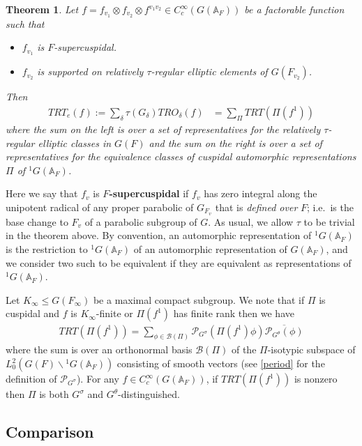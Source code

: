 \documentclass[12pt]{amsart}
\newtheorem{thm}{Theorem}[section]
\theoremstyle{remark}
\numberwithin{equation}{section}
\newcommand{\A}{\mathbb{A}}
\theoremstyle{definition}
\numberwithin{equation}{subsection}
\begin{document}
\begin{thm} \label{thm-rel-trace-formula} Let $f=f_{v_1} \otimes f_{v_2}\otimes f^{v_1v_2} \in C_c^{\infty}(G(\A_F))$ be a factorable function such that
\begin{itemize}
\item $f_{v_1}$ is $F$-supercuspidal.
\item $f_{v_2}$ is supported on relatively $\tau$-regular elliptic elements of $G(F_{v_2})$.
\end{itemize}
Then
\begin{align}\label{rtf}
TRT_e(f):=\sum_{\delta}\tau(G_{\delta}) TRO_{\delta}(f)
&=
\sum_{\Pi} TRT(\Pi(f^1))
\end{align}
where the sum on the left is over a set of representatives for the relatively $\tau$-regular elliptic classes in $G(F)$ and the sum on the right
is over a set of representatives for the equivalence classes of cuspidal automorphic representations $\Pi$  of ${}^1G(\A_F)$.
\end{thm}
Here we say that $f_v$ is
\textbf{$F$-supercuspidal} if $f_v$ has zero integral along the unipotent radical of any proper parabolic of $G_{F_v}$ that is
\emph{defined over} $F$; i.e.~is the base change to $F_v$ of a parabolic subgroup of $G$.
As usual, we allow $\tau$ to be trivial in the theorem above.
By convention, an automorphic representation of ${}^1G(\A_F)$ is the restriction to ${}^1G(\A_F)$ of an automorphic representation of $G(\A_F)$, and we consider two such to be equivalent if they are equivalent as representations of ${}^1G(\A_F)$.

Let $K_{\infty} \leq G(F_{\infty})$ be a maximal compact subgroup.  We note that if $\Pi$ is cuspidal and $f$ is $K_{\infty}$-finite or $\Pi(f^1)$ has finite rank then we have
\begin{align} \label{if-k-finite}
TRT(\Pi(f^1))=\sum_{\phi \in \mathcal{B}(\Pi)}\mathcal{P}_{G^{\sigma}}(\Pi(f^1)\phi)\overline{\mathcal{P}_{G^{\theta}}(\phi)}
\end{align}
where the sum is over an orthonormal basis $\mathcal{B}(\Pi)$ of the $\Pi$-isotypic subspace of $L^2_0(G(F) \backslash {}^1G(\A_F))$ consisting of smooth vectors (see \eqref{period} for the definition of $\mathcal{P}_{G^{\sigma}}$).
  For any $f \in C_c^{\infty}(G(\A_F))$, if $TRT(\Pi(f^1))$ is nonzero then $\Pi$ is both $G^{\sigma}$ and $G^{\theta}$-distinguished.




\subsection{Comparison}
\end{document}
